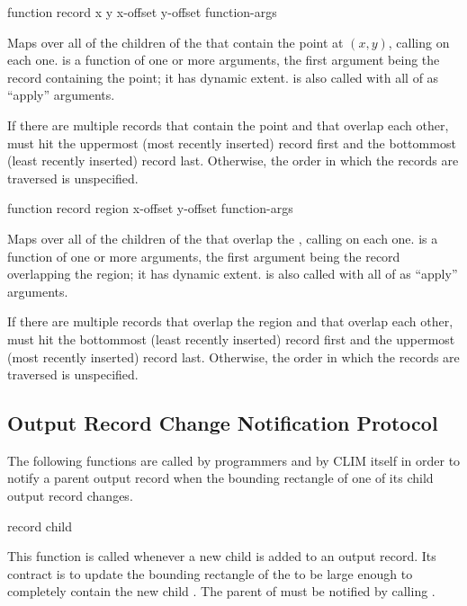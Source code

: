             {function record x y \optional x-offset y-offset \rest function-args}

Maps over all of the children of the   that
contain the point at $(x,y)$, calling  on each one.
 is a function of one or more arguments, the first argument being
the record containing the point; it has dynamic extent.   is also
called with all of  as ``apply'' arguments.

If there are multiple records that contain the point and that overlap each
other,  must hit the uppermost
(most recently inserted) record first and the bottommost (least recently
inserted) record last.  Otherwise, the order in which the records are traversed
is unspecified.

            {function record region \optional x-offset y-offset \rest function-args}

Maps over all of the children of the   that
overlap the  , calling  on each one.
 is a function of one or more arguments, the first argument being
the record overlapping the region; it has dynamic extent.   is
also called with all of  as ``apply'' arguments.

If there are multiple records that overlap the region and that overlap each
other,  must hit the bottommost
(least recently inserted) record first and the uppermost (most recently
inserted) record last.  Otherwise, the order in which the records are traversed
is unspecified.


\subsection {Output Record Change Notification Protocol}

The following functions are called by programmers and by CLIM itself in order to
notify a parent output record when the bounding rectangle of one of its child output
record changes.

 {record child}

This function is called whenever a new child is added to an output record.  Its
contract is to update the bounding rectangle of the 
 to be large enough to completely contain the new child  . The parent of  must be notified by calling
.

